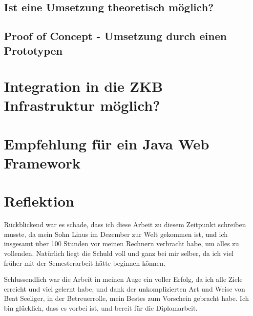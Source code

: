 \documentclass[abstracton, listof=totocnumbered,
bibliography=totocnumbered]{scrreprt}
\begin{document}
  \section{Ist eine Umsetzung theoretisch möglich?}
  
  \section{Proof of Concept - Umsetzung durch einen Prototypen}
  
  \chapter{Integration in die ZKB Infrastruktur möglich?}
  
  \chapter{Empfehlung für ein Java Web Framework}
  
  \chapter{Reflektion}
  
  Rückblickend war es schade, dass ich diese Arbeit zu diesem Zeitpunkt
  schreiben musste, da mein Sohn Linus im Dezember zur Welt gekommen ist, und
  ich insgesamt über 100 Stunden vor meinen Rechnern verbracht habe, um alles
  zu vollenden. Natürlich liegt die Schuld voll und ganz bei mir selber, da ich
  viel früher mit der Semesterarbeit hätte beginnen können.
  
  Schlussendlich war die Arbeit in meinen Auge ein voller Erfolg, da ich alle
  Ziele erreicht und viel gelernt habe, und dank der unkomplizierten Art und Weise von
  Beat Seeliger, in der Betreuerrolle, mein Bestes zum Vorschein gebracht habe.
  Ich bin glücklich, dass es vorbei ist, und bereit für die Diplomarbeit.
  
  
  \appendix
  
%  
  
\end{document}
